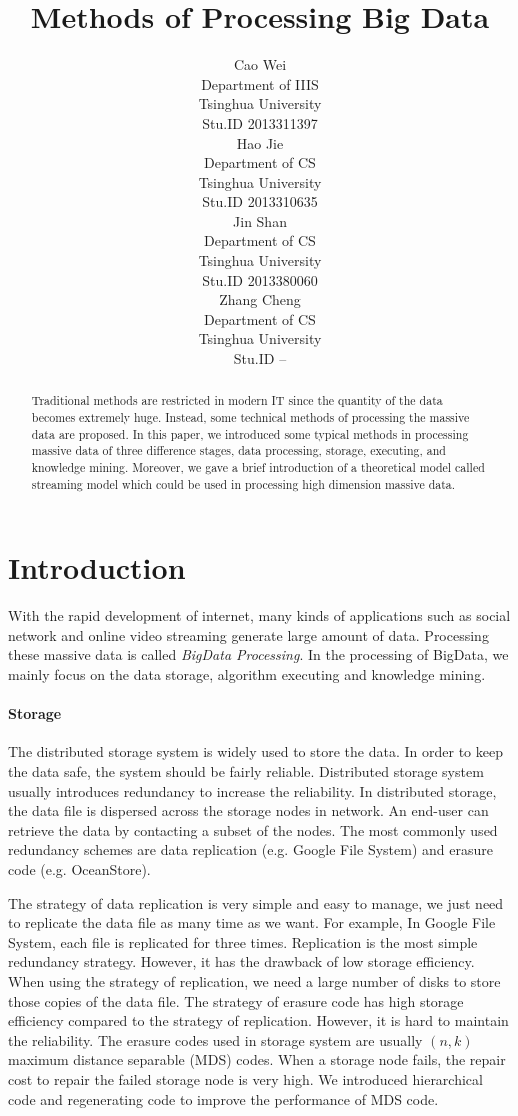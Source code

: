 \documentclass{article} %
\title{Methods of Processing Big Data}
\author{
Cao Wei \\
Department of IIIS\\
Tsinghua University\\
Stu.ID 2013311397 \\
\And
Hao Jie \\
Department of CS\\
Tsinghua University\\
Stu.ID 2013310635 \\
\And
Jin Shan \\
Department of CS\\
Tsinghua University\\
Stu.ID 2013380060 \\
\And
Zhang Cheng \\
Department of CS\\
Tsinghua University\\
Stu.ID -- \\
}
\begin{document}
\maketitle

\begin{abstract}
Traditional methods are restricted in modern IT since the quantity of the data becomes extremely huge. Instead, some technical methods of processing the massive data are proposed. In this paper, we introduced some typical methods in processing massive data of three difference stages, data processing, storage, executing, and knowledge mining. Moreover, we gave a brief introduction of a theoretical model called streaming model which could be used in processing high dimension massive data.
\end{abstract}

\section{Introduction}
 With the rapid development of internet, many kinds of applications such as social network and online video streaming generate large amount of data. Processing these massive data is called \emph{BigData Processing}. In the processing of BigData, we mainly focus on the data storage, algorithm executing and knowledge mining.
 
 \paragraph{Storage}The distributed storage system is widely used to store the data. In order to keep the data safe, the system should be fairly reliable. Distributed storage system usually introduces redundancy to increase the reliability. In distributed storage, the data file is dispersed across the storage nodes in network. An end-user can retrieve the data by contacting a subset of the nodes. The most commonly used redundancy schemes are data replication (e.g. Google File System) and erasure code (e.g. OceanStore).

The strategy of data replication is very simple and easy to manage, we just need to replicate the data file as many time as we want. For example, In Google File System, each file is replicated for three times. Replication is the most simple redundancy strategy. However, it has the drawback of low storage efficiency. When using the strategy of replication, we need a large number of disks to store those copies of the data file. The strategy of erasure code has high storage efficiency compared to the strategy of replication. However, it is hard to maintain the reliability. The erasure codes used in storage system are usually $(n, k)$ maximum distance separable (MDS) codes. When a storage node fails, the repair cost to repair the failed storage node is very high. We introduced hierarchical code and regenerating code to improve the performance of MDS code.
\end{document}

